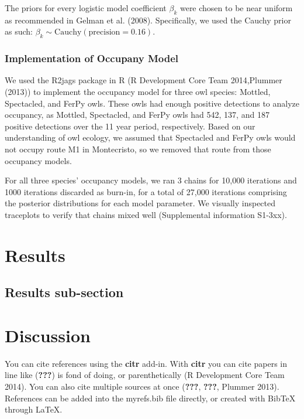\documentclass[]{article}
\begin{document}
The priors for every logistic model coefficient \(\beta_k\) were chosen
to be near uniform as recommended in Gelman et al. (2008). Specifically,
we used the Cauchy prior as such:
\(\beta_k \sim \text{Cauchy}(\text{precision} = 0.16)\).

\subsubsection{Implementation of Occupany
Model}\label{implementation-of-occupany-model}

We used the R2jags package in R (R Development Core Team 2014,Plummer
(2013)) to implement the occupancy model for three owl species: Mottled,
Spectacled, and FerPy owls. These owls had enough positive detections to
analyze occupancy, as Mottled, Spectacled, and FerPy owls had 542, 137,
and 187 positive detections over the 11 year period, respectively. Based
on our understanding of owl ecology, we assumed that Spectacled and
FerPy owls would not occupy route M1 in Montecristo, so we removed that
route from those occupancy models.

For all three species' occupancy models, we ran 3 chains for 10,000
iterations and 1000 iterations discarded as burn-in, for a total of
27,000 iterations comprising the posterior distributions for each model
parameter. We visually inspected traceplots to verify that chains mixed
well (Supplemental information S1-3xx).

\section{Results}\label{results}

\subsection{Results sub-section}\label{results-sub-section}

\section{Discussion}\label{discussion}

You can cite references using the \textbf{citr} add-in. With
\textbf{citr} you can cite papers in line like ({\textbf{???}}) is fond
of doing, or parenthetically (R Development Core Team 2014). You can
also cite multiple sources at once ({\textbf{???}}, {\textbf{???}},
Plummer 2013). References can be added into the myrefs.bib file
directly, or created with BibTeX through LaTeX.
\end{document}
